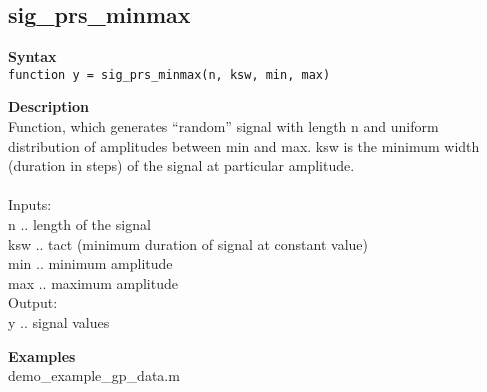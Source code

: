 \subsection*{sig\_prs\_minmax} \label{fun:sig_prs_minmax}

\textbf{Syntax}
\\  \texttt{function y = sig\_prs\_minmax(n, ksw, min, max)}

\textbf{Description}
\\  Function, which generates ``random'' signal with length n and uniform
  distribution of amplitudes between min and max. ksw is the
minimum width   (duration in steps) of the signal at particular
amplitude.
\\
\\ Inputs:
\\ n .. length of the signal
\\ ksw .. tact (minimum duration of signal at constant value)
\\ min .. minimum amplitude
\\ max .. maximum amplitude
\\ Output:
\\ y .. signal values

\textbf{Examples}
\\ demo\_example\_gp\_data.m
